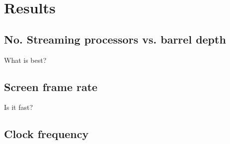 \documentclass[../main/report.tex]{subfiles}
\begin{document}
\chapter{Results}

\section{No. Streaming processors vs. barrel depth}

What is best?

\section{Screen frame rate}
Is it fast?

\section{Clock frequency}
\end{document}
